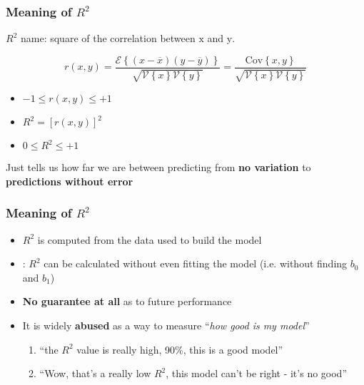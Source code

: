 \begin{frame}\frametitle{Meaning of $R^2$}

	$R^2$ name: square of the correlation between $\mathrm{x}$ and $\mathrm{y}$.
	\begin{exampleblock}{}
		$$ r(x, y) = \dfrac{\mathcal{E}\left\{ (x - \overline{x}) (y - \overline{y})\right\}}{\sqrt{\mathcal{V}\left\{x\right\}\mathcal{V}\left\{y\right\}}} = \dfrac{\text{Cov}\left\{x, y\right\}}{\sqrt{\mathcal{V}\left\{x\right\}\mathcal{V}\left\{y\right\}}} $$
	\end{exampleblock}

	\vspace{12pt}
	\begin{itemize}
		\item	$-1 \leq r(x,y) \leq +1$
		\item	$R^2 = \left[r(x,y)\right]^2$
		\item	$0 \leq R^2 \leq +1 $
	\end{itemize}
	
	\vspace{12pt}
	Just tells us how far we are between predicting from \textbf{no variation} to \textbf{predictions without error}
\end{frame}

\begin{frame}\frametitle{Meaning of $R^2$}
	\begin{itemize}
		\item	$R^2$ is computed from the data used to build the model
		\item	{\color{myOrange}{Note}}:  $R^2$ can be calculated without even fitting the model (i.e. without finding $b_0$ and $b_1$)
		\item	\textbf{No guarantee at all} as to future performance
		\item	It is widely \textbf{abused} as a way to measure ``\emph{how good is my model}''
		\begin{enumerate}
			\item	``the $R^2$ value is really high, 90\%, this is a good model''
			\item	``Wow, that's a really low $R^2$, this model can't be right - it's no good''
		\end{enumerate}
	\end{itemize}
\end{frame}

